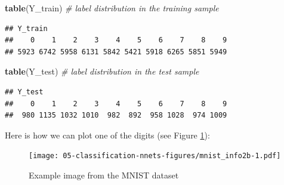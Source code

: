 \documentclass[10pt,b5paper,krantz1]{krantz}
\newenvironment{Shaded}{\begin{snugshade}}{\end{snugshade}}
\newcommand{\CommentTok}[1]{\textcolor[rgb]{0.37,0.37,0.37}{\textit{#1}}}
\newcommand{\DataTypeTok}[1]{\textcolor[rgb]{0.27,0.27,0.27}{#1}}
\newcommand{\DecValTok}[1]{\textcolor[rgb]{0.06,0.06,0.06}{#1}}
\newcommand{\KeywordTok}[1]{\textcolor[rgb]{0.27,0.27,0.27}{\textbf{#1}}}
\newcommand{\NormalTok}[1]{#1}
\newcommand{\OtherTok}[1]{\textcolor[rgb]{0.37,0.37,0.37}{#1}}
\newcommand{\StringTok}[1]{\textcolor[rgb]{0.5,0.5,0.5}{#1}}
\begin{document}
\begin{Shaded}
\begin{Highlighting}[]
\KeywordTok{table}\NormalTok{(Y_train) }\CommentTok{# label distribution in the training sample}
\end{Highlighting}
\end{Shaded}

\begin{verbatim}
## Y_train
##    0    1    2    3    4    5    6    7    8    9 
## 5923 6742 5958 6131 5842 5421 5918 6265 5851 5949
\end{verbatim}

\begin{Shaded}
\begin{Highlighting}[]
\KeywordTok{table}\NormalTok{(Y_test)  }\CommentTok{# label distribution in the test sample}
\end{Highlighting}
\end{Shaded}

\begin{verbatim}
## Y_test
##    0    1    2    3    4    5    6    7    8    9 
##  980 1135 1032 1010  982  892  958 1028  974 1009
\end{verbatim}

Here is how we can plot one of the digits (see Figure \ref{fig:mnist_info2b}):

\begin{Shaded}
\end{Shaded}

\begin{figure}
\hypertarget{fig:mnist_info2b}{%
\centering
\texttt{[image: 05-classification-nnets-figures/mnist\_info2b-1.pdf]}
\caption{Example image from the MNIST dataset}\label{fig:mnist_info2b}
}
\end{figure}
\end{document}
